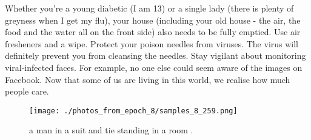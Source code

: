 \documentclass{article}%
\begin{document}
Whether you're a young diabetic (I am 13) or a single lady (there is plenty of greyness when I get my flu), your house (including your old house {-} the air, the food and the water all on the front side) also needs to be fully emptied. Use air fresheners and a wipe.\newline%
Protect your poison needles from viruses. The virus will definitely prevent you from cleansing the needles.\newline%
Stay vigilant about monitoring viral{-}infected faces. For example, no one else could seem aware of the images on Facebook. Now that some of us are living in this world, we realise how much people care.\newline%

%


\begin{figure}[h!]%
\centering%
\texttt{[image: ./photos\_from\_epoch\_8/samples\_8\_259.png]}%
\caption{a man in a suit and tie standing in a room .}%
\end{figure}

%
\end{document}
